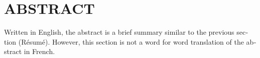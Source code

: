 %

\chapter*{ABSTRACT}\thispagestyle{headings}
%
\begin{otherlanguage}{english}

Written in English, the abstract is a brief summary similar to the previous
section {(Résumé)}. However, this section is not a
word for word translation of the abstract in French.

\end{otherlanguage}
